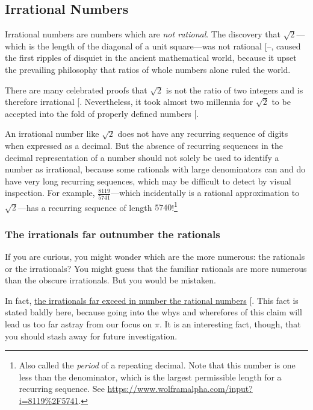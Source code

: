 \documentclass[
  a4paper,
]{article}
\begin{document}
\subsection{Irrational Numbers}\label{irrational-numbers}

Irrational numbers are numbers which are \emph{not rational}. The
discovery that \(\sqrt{2}\)---which is the length of the diagonal of a
unit square---was not rational
{[}--\citeproc{ref-havil-irrationals-2012}{4}{]},
caused the first ripples of disquiet in the ancient mathematical world,
because it upset the prevailing philosophy that ratios of whole numbers
alone ruled the world.

There are many celebrated proofs that \(\sqrt{2}\) is not the ratio of
two integers and is therefore irrational
{[}\citeproc{ref-bogomolny2018}{5}{]}. Nevertheless, it took almost two
millennia for \(\sqrt{2}\) to be accepted into the fold of properly
defined numbers {[}\citeproc{ref-cepelewicz2024}{6}{]}.

An irrational number like \(\sqrt{2}\) does not have any recurring
sequence of digits when expressed as a decimal. But the absence of
recurring sequences in the decimal representation of a number should not
solely be used to identify a number as irrational, because some
rationals with large denominators can and do have very long recurring
sequences, which may be difficult to detect by visual inspection. For
example, \(\frac{8119}{5741}\)---which incidentally is a rational
approximation to \(\sqrt{2}\)---has a recurring sequence of length
\(5740\)!\footnote{Also called the \emph{period} of a repeating decimal.
  Note that this number is one less than the denominator, which is the
  largest permissible length for a recurring sequence. See
  \url{https://www.wolframalpha.com/input?i=8119\%2F5741}.}

\subsubsection{The irrationals far outnumber the
rationals}\label{the-irrationals-far-outnumber-the-rationals}

If you are curious, you might wonder which are the more numerous: the
rationals or the irrationals? You might guess that the familiar
rationals are more numerous than the obscure irrationals. But you would
be mistaken.

In fact,
\href{https://socratic.org/questions/58c80a37b72cff29df40c794}{the
irrationals far exceed in number the rational numbers}
{[}\citeproc{ref-socratic}{7}{]}. This fact is stated baldly here,
because going into the whys and wherefores of this claim will lead us
too far astray from our focus on \(\pi\). It is an interesting fact,
though, that you should stash away for future investigation.
\end{document}
